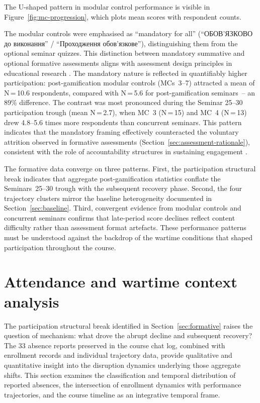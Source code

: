 The U-shaped pattern in modular control performance is visible in Figure~\ref{fig:mc-progression}, which plots mean scores with respondent counts.

The modular controls were emphasised as ``mandatory for all'' (``ОБОВ'ЯЗКОВО до виконання'' / ``Проходження обов'язкове''), distinguishing them from the optional seminar quizzes. This distinction between mandatory summative and optional formative assessments aligns with assessment design principles in educational research \cite{Hattie2009, Bonwell1991}. The mandatory nature is reflected in quantifiably higher participation: post-gamification modular controls (MCs~3--7) attracted a mean of N\,=\,10.6 respondents, compared with N\,=\,5.6 for post-gamification seminars~-- an 89\% difference. The contrast was most pronounced during the Seminar 25--30 participation trough (mean N\,=\,2.7), when MC~3 (N\,=\,15) and MC~4 (N\,=\,13) drew 4.8--5.6 times more respondents than concurrent seminars. This pattern indicates that the mandatory framing effectively counteracted the voluntary attrition observed in formative assessments (Section~\ref{sec:assessment-rationale}), consistent with the role of accountability structures in sustaining engagement \cite{Hattie2009}.

The formative data converge on three patterns. First, the participation structural break indicates that aggregate post-gamification statistics conflate the Seminars~25--30 trough with the subsequent recovery phase. Second, the four trajectory clusters mirror the baseline heterogeneity documented in Section~\ref{sec:baseline}. Third, convergent evidence from modular controls and concurrent seminars confirms that late-period score declines reflect content difficulty rather than assessment format artefacts. These performance patterns must be understood against the backdrop of the wartime conditions that shaped participation throughout the course.

\section{Attendance and wartime context analysis} \label{sec:attendance}

The participation structural break identified in Section~\ref{sec:formative} raises the question of mechanism: what drove the abrupt decline and subsequent recovery? The 33 absence reports preserved in the course chat log, combined with enrollment records and individual trajectory data, provide qualitative and quantitative insight into the disruption dynamics underlying those aggregate shifts. This section examines the classification and temporal distribution of reported absences, the intersection of enrollment dynamics with performance trajectories, and the course timeline as an integrative temporal frame.


